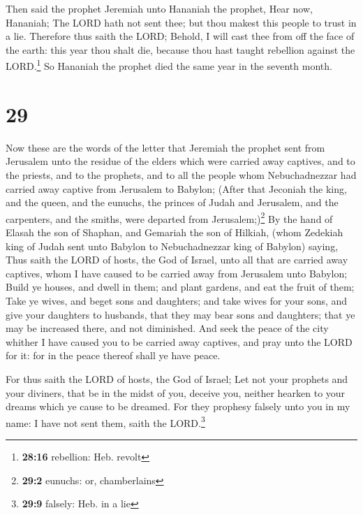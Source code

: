  Then said the prophet Jeremiah unto Hananiah the
prophet, Hear now, Hananiah; The LORD hath not sent thee; but thou
makest this people to trust in a lie.  Therefore thus
saith the LORD; Behold, I will cast thee from off the face of the earth:
this year thou shalt die, because thou hast taught rebellion against the
LORD.\footnote{\textbf{28:16} rebellion: Heb. revolt}  So
Hananiah the prophet died the same year in the seventh month.

\hypertarget{section-28}{%
\section{29}\label{section-28}}

 Now these are the words of the letter that Jeremiah the
prophet sent from Jerusalem unto the residue of the elders which were
carried away captives, and to the priests, and to the prophets, and to
all the people whom Nebuchadnezzar had carried away captive from
Jerusalem to Babylon;  (After that Jeconiah the king, and
the queen, and the eunuchs, the princes of Judah and Jerusalem, and the
carpenters, and the smiths, were departed from Jerusalem;)\footnote{\textbf{29:2}
  eunuchs: or, chamberlains}  By the hand of Elasah the
son of Shaphan, and Gemariah the son of Hilkiah, (whom Zedekiah king of
Judah sent unto Babylon to Nebuchadnezzar king of Babylon) saying,
 Thus saith the LORD of hosts, the God of Israel, unto all
that are carried away captives, whom I have caused to be carried away
from Jerusalem unto Babylon;  Build ye houses, and dwell
in them; and plant gardens, and eat the fruit of them; 
Take ye wives, and beget sons and daughters; and take wives for your
sons, and give your daughters to husbands, that they may bear sons and
daughters; that ye may be increased there, and not diminished.
 And seek the peace of the city whither I have caused you
to be carried away captives, and pray unto the LORD for it: for in the
peace thereof shall ye have peace.

 For thus saith the LORD of hosts, the God of Israel; Let
not your prophets and your diviners, that be in the midst of you,
deceive you, neither hearken to your dreams which ye cause to be
dreamed.  For they prophesy falsely unto you in my name: I
have not sent them, saith the LORD.\footnote{\textbf{29:9} falsely: Heb.
  in a lie}

